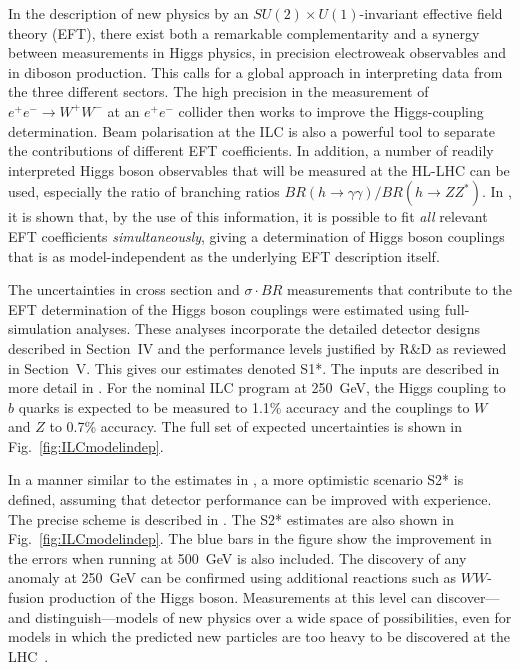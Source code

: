 \documentclass[%
 reprint,
 amsmath,amssymb,
 aps,
]{revtex4-1}
\begin{document}
In the description of new physics by an $SU(2)\times U(1)$-invariant effective field theory (EFT), there exist both a remarkable complementarity and a synergy between measurements in Higgs physics, in precision electroweak observables and in diboson production. This calls for a global approach in interpreting data from the three different sectors. The high precision in  the measurement of $e^+e^- \to W^+W^-$ at an $e^+e^-$ collider then works to improve the Higgs-coupling determination. Beam polarisation at the ILC is also a powerful tool
to separate the contributions of different EFT
coefficients.  In addition, a number of readily interpreted Higgs boson observables that will be measured at the HL-LHC can be used, especially the 
ratio of branching ratios  $BR(h\to \gamma\gamma)/BR(h\to ZZ^*)$. 
  In \cite{Barklow:2017suo}, it is shown that, by the use of this information, 
  it is possible to fit {\it all}
relevant EFT
coefficients  {\it simultaneously}, giving a 
determination of Higgs boson couplings that is as
model-independent as the underlying EFT description itself. 

 
The uncertainties in  cross section and $\sigma\cdot BR$ measurements that contribute to the EFT determination of the Higgs boson couplings were estimated using full-simulation analyses.  These analyses incorporate the detailed detector designs described in Section~IV and the performance levels justified by R\&D as reviewed in Section~V. This gives our estimates denoted S1*.  The inputs are described in more detail in \cite{ILCforESS}. 
For the nominal ILC program at 250~GeV, the Higgs
coupling to $b$ quarks is expected to be measured to 1.1\% accuracy and the
couplings to $W$ and $Z$ to 0.7\% accuracy. 
The full set  of  expected
uncertainties  is shown in Fig.~\ref{fig:ILCmodelindep}. 

In a manner similar to the estimates in \cite{Yellow}, a more optimistic scenario S2* is defined, assuming that detector performance can be improved with experience.   The precise scheme is described in \cite{ILCforESS}.   The S2* estimates are also shown in Fig.~\ref{fig:ILCmodelindep}.   The blue bars in the figure show the improvement in the errors when running at 500~GeV is also included.    The 
discovery of any anomaly at 250~GeV can be confirmed 
using additional reactions  such as $WW$-fusion production of the
Higgs boson.   Measurements at this
level can discover---and distinguish---models of new physics over a
wide space of possibilities, even for models in which the predicted new
particles are too heavy to be discovered at the
LHC~\cite{Barklow:2017suo}.
\end{document}
